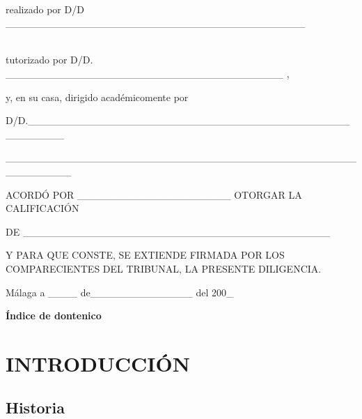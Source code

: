\documentclass[12pt]{article}
\begin{document}
\leavevmode \\
realizado por D\textordmasculine{}/D\textordfeminine{}
\_\_\_\_\_\_\_\_\_\_\_\_\_\_\_\_\_\_\_\_\_\_\_\_\_\_\_\_\_\_\_\_\_\_\_\_\_\_\_\_\_


\leavevmode \\
tutorizado por D\textordmasculine{}/D\textordfeminine{}.
\_\_\_\_\_\_\_\_\_\_\_\_\_\_\_\_\_\_\_\_\_\_\_\_\_\_\_\_\_\_\_\_\_\_\_\_\_\_ ,



y, en su casa, dirigido acad\'{e}micomente por


D\textordmasculine{}/D\textordfeminine{}.\_\_\_\_\_\_\_\_\_\_\_\_\_\_\_\_\_\_\_\_\_\_\_\_\_\_\_\_\_\_\_\_\_\_\_\_\_\_\_\_\_\_\_\_\_\_\_\_\_\_\_\_


\_\_\_\_\_\_\_\_\_\_\_\_\_\_\_\_\_\_\_\_\_\_\_\_\_\_\_\_\_\_\_\_\_\_\_\_\_\_\_\_\_\_\_\_\_\_\_\_\_\_\_\_\_\_\_\_\_



ACORD\'{O} POR \_\_\_\_\_\_\_\_\_\_\_\_\_\_\_\_\_\_\_\_\_ OTORGAR LA
CALIFICACI\'{O}N

DE
\_\_\_\_\_\_\_\_\_\_\_\_\_\_\_\_\_\_\_\_\_\_\_\_\_\_\_\_\_\_\_\_\_\_\_\_\_\_\_\_\_\_

Y PARA QUE CONSTE, SE EXTIENDE FIRMADA POR LOS COMPARECIENTES DEL TRIBUNAL, LA
PRESENTE DILIGENCIA.

M\'{a}laga a \_\_\_\_ de\_\_\_\_\_\_\_\_\_\_\_\_\_\_ del 200\_

\textbf{\'{I}ndice de dontenico}
\tableofcontents


\section{INTRODUCCI\'{O}N}
 \subsection{Historia}
\end{document}
